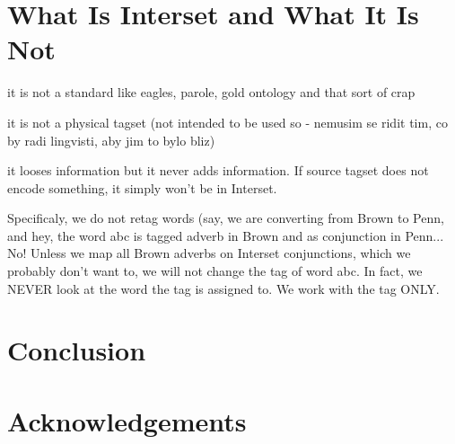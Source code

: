 \documentclass[11pt]{article}
\begin{document}
\section{What Is Interset and What It Is Not}
\label{sec:whatisit}

\begin{compactitem}
\item it is not a standard like eagles, parole, gold ontology and that sort of crap
\item it is not a physical tagset (not intended to be used so - nemusim se ridit tim, co by radi lingvisti, aby jim to bylo bliz)
\item it looses information but it never adds information. If source tagset does not encode something, it simply won't be in Interset.
\item Specificaly, we do not retag words (say, we are converting from Brown to Penn, and hey, the word abc is tagged adverb in Brown and as conjunction in Penn... No! Unless we map all Brown adverbs on Interset conjunctions, which we probably don't want to, we will not change the tag of word abc. In fact, we NEVER look at the word the tag is assigned to. We work with the tag ONLY.
\end{compactitem}

\section{Conclusion}
\label{sec:conclusion}

\section*{Acknowledgements}


\begin{small}

\end{small}
\end{document}
